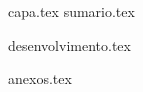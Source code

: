 \documentclass[
	12pt,				%
	oneside,			%
	a4paper,			%
	chapter=TITLE,
	sumario=tradicional,
	english,			%
	brazil				%
]{abntex2}
\begin{document}

\frenchspacing 

{capa.tex}
{sumario.tex}

\textual

\pagestyle{simple}

\begin{OnehalfSpace*}
	
{desenvolvimento.tex}

\end{OnehalfSpace*}

\postextual

{anexos.tex}
\end{document}
